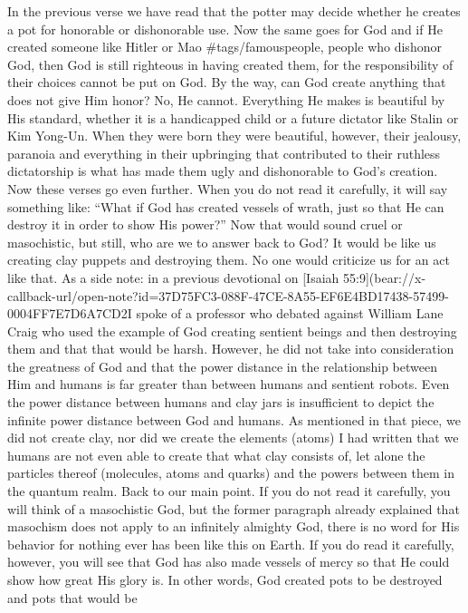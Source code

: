In the previous verse we have read that the potter may decide whether he
creates a pot for honorable or dishonorable use. Now the same goes for
God and if He created someone like Hitler or Mao \#tags/famouspeople,
people who dishonor God, then God is still righteous in having created
them, for the responsibility of their choices cannot be put on God. By
the way, can God create anything that does not give Him honor? No, He
cannot. Everything He makes is beautiful by His standard, whether it is
a handicapped child or a future dictator like Stalin or Kim Yong-Un.
When they were born they were beautiful, however, their jealousy,
paranoia and everything in their upbringing that contributed to their
ruthless dictatorship is what has made them ugly and dishonorable to
God's creation. Now these verses go even further. When you do not read
it carefully, it will say something like: ``What if God has created
vessels of wrath, just so that He can destroy it in order to show His
power?'' Now that would sound cruel or masochistic, but still, who are
we to answer back to God? It would be like us creating clay puppets and
destroying them. No one would criticize us for an act like that. As a
side note: in a previous devotional on {[}Isaiah
55:9{]}(bear://x-callback-url/open-note?id=37D75FC3-088F-47CE-8A55-EF6E4BD17438-57499-0004FF7E7D6A7CD2I
spoke of a professor who debated against William Lane Craig who used the
example of God creating sentient beings and then destroying them and
that that would be harsh. However, he did not take into consideration
the greatness of God and that the power distance in the relationship
between Him and humans is far greater than between humans and sentient
robots. Even the power distance between humans and clay jars is
insufficient to depict the infinite power distance between God and
humans. As mentioned in that piece, we did not create clay, nor did we
create the elements (atoms) I had written that we humans are not even
able to create that what clay consists of, let alone the particles
thereof (molecules, atoms and quarks) and the powers between them in the
quantum realm. Back to our main point. If you do not read it carefully,
you will think of a masochistic God, but the former paragraph already
explained that masochism does not apply to an infinitely almighty God,
there is no word for His behavior for nothing ever has been like this on
Earth. If you do read it carefully, however, you will see that God has
also made vessels of mercy so that He could show how great His glory is.
In other words, God created pots to be destroyed and pots that would be

